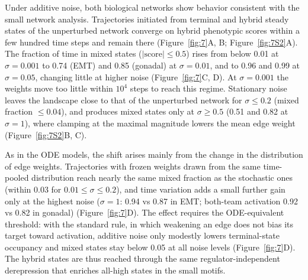 \documentclass[11pt]{article}
\begin{document}
Under additive noise, both biological networks show behavior consistent with the small network analysis. Trajectories initiated from terminal and hybrid steady states of the unperturbed network converge on hybrid phenotypic scores within a few hundred time steps and remain there (Figure~\ref{fig:7}A, B; Figure~\ref{fig:7S2}A). The fraction of time in mixed states ($|\text{score}| \le 0.5$) rises from below 0.01 at $\sigma = 0.001$ to 0.74 (EMT) and 0.85 (gonadal) at $\sigma = 0.01$, and to 0.96 and 0.99 at $\sigma = 0.05$, changing little at higher noise (Figure~\ref{fig:7}C, D). At $\sigma = 0.001$ the weights move too little within $10^4$ steps to reach this regime. Stationary noise leaves the landscape close to that of the unperturbed network for $\sigma \le 0.2$ (mixed fraction $\le 0.04$), and produces mixed states only at $\sigma \ge 0.5$ (0.51 and 0.82 at $\sigma = 1$), where clamping at the maximal magnitude lowers the mean edge weight (Figure~\ref{fig:7S2}B, C).

As in the ODE models, the shift arises mainly from the change in the distribution of edge weights. Trajectories with frozen weights drawn from the same time-pooled distribution reach nearly the same mixed fraction as the stochastic ones (within 0.03 for $0.01 \le \sigma \le 0.2$), and time variation adds a small further gain only at the highest noise ($\sigma = 1$: 0.94 vs 0.87 in EMT; both-team activation 0.92 vs 0.82 in gonadal) (Figure~\ref{fig:7}D). The effect requires the ODE-equivalent threshold: with the standard rule, in which weakening an edge does not bias its target toward activation, additive noise only modestly lowers terminal-state occupancy and mixed states stay below 0.05 at all noise levels (Figure~\ref{fig:7}D). The hybrid states are thus reached through the same regulator-independent derepression that enriches all-high states in the small motifs.
\end{document}
